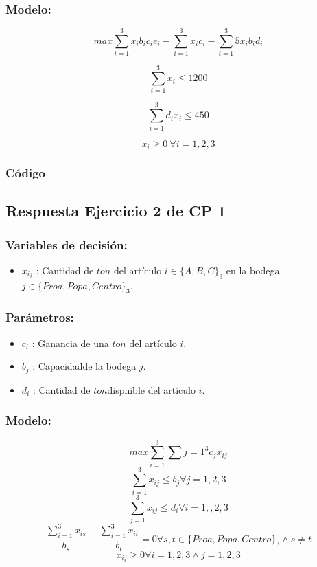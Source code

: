 \documentclass[]{article}
\begin{document}
  \subsubsection*{Modelo:} 

$$ max \sum_{i = 1}^3 x_i b_i c_i e_i - \sum_{i = 1}^3 x_i c_i - \sum_{i = 1}^3 5 x_i b_i d_i $$

$$ \sum_{i=1}^3 x_i \leq 1200$$

$$ \sum_{i=1}^3 d_i x_i \leq 450$$

$$ x_i \geq 0\ \forall i = 1, 2, 3$$

\subsubsection*{C\'odigo}


\subsection*{Respuesta Ejercicio 2 de CP 1}

\subsubsection*{Variables de decisi\'on:}

\begin{itemize}
	\item $x_{ij}$ : Cantidad de $ton$ del art\'iculo $i\in\{A,B,C\}_3$ en la bodega $j\in\{Proa, Popa, Centro\}_3$.
\end{itemize}

\subsubsection*{Par\'ametros:}

\begin{itemize}
	\item $c_i$ : Ganancia de una $ton$ del art\'iculo $i$.
	\item $b_j$ : Capacidadde la bodega $j$.
	\item $d_i$ : Cantidad de $ton$dispnible del art\'iculo $i$.
\end{itemize}

\subsubsection*{Modelo:}

	$$ max \sum_{i=1}^3\sum{j=1}^3 c_j x_{ij} $$
	$$ \sum_{i=1}^3 x_{ij}\leq b_j \forall j = 1,2,3 $$
	$$ \sum_{j=1}^3 x_{ij}\leq d_i \forall i = 1,,2,3 $$
	$$ \frac{\sum_{i=1}^3 x_{is}}{b_s} - \frac{\sum_{i=1}^3 x_{it}}{b_t} = 0\forall s,t\in \{Proa,Popa,Centro\}_3 \wedge s\neq t $$
	$$ x_{ij} \geq 0\forall i =1,2,3\wedge j = 1,2,3 $$
\end{document}
